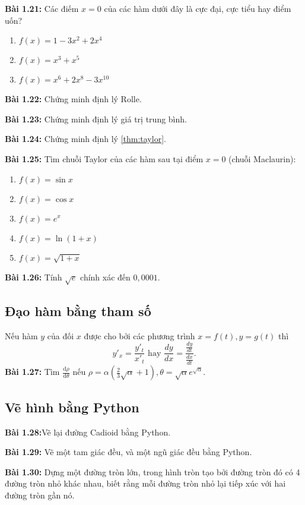 \textbf{Bài 1.21:} Các điếm \(x=0\) của các hàm dưới đây là cực đại, cực tiểu hay điểm uốn?
\begin{enumerate}[label=(\alph*)]
    \item \(f(x)=1-3x^2+2x^4\)
    \item \(f(x)=x^3+x^5\)
    \item \(f(x)=x^6+2x^8-3x^{10}\)
\end{enumerate}
\vspace{5pt}

\textbf{Bài 1.22:} Chứng minh định lý Rolle.
\vspace{5pt}

\textbf{Bài 1.23:} Chứng minh định lý giá trị trung bình.
\vspace{5pt}

\textbf{Bài 1.24:} Chứng minh định lý \ref{thm:taylor}.

\textbf{Bài 1.25:} Tìm chuỗi Taylor của các hàm sau tại điểm \(x=0\) (chuỗi Maclaurin):
\begin{enumerate}[label=(\alph*)]
    \item \(f(x)=\sin x\)
    \item \(f(x)=\cos x\)
    \item \(f(x)=e^x\)
    \item \(f(x)=\ln(1+x)\)
    \item \(f(x)=\sqrt{1+x}\)
\end{enumerate}
\vspace{5pt}

\textbf{Bài 1.26:} Tính \(\sqrt{e}\) chính xác đến \(0,0001\). 
\vspace{5pt}

\subsection*{Đạo hàm bằng tham số}
Nếu hàm \(y\) của đối \(x\) được cho bởi các phương trình \(x=f(t), y=g(t)\) thì
\[y'_x =\frac{y'_t}{x'_t} \text{ hay } \frac{dy}{dx}=\frac{\frac{dy}{dt}}{\frac{dx}{dt}}.\] 
\textbf{Bài 1.27:} Tìm \(\frac{\text{d}\rho}{\text{d}\theta}\) nếu \(\rho=\alpha\left(\frac{2}{3}\sqrt{\alpha}+1\right), \theta = \sqrt{\alpha}e^{\sqrt{\alpha}}.\)

\subsection*{Vẽ hình bằng Python}
\textbf{Bài 1.28:}Vẽ lại đường Cadioid  bằng Python.
\vspace{5pt}

\textbf{Bài 1.29:} Vẽ một tam giác đều, và một ngũ giác đều bằng Python.
\vspace{5pt}

\textbf{Bài 1.30:} Dựng một đường tròn lớn, trong hình tròn tạo bởi đường tròn đó có 4 đường tròn nhỏ khác nhau, biết rằng mỗi đường tròn nhỏ lại tiếp xúc với hai đường tròn gần nó.
\vspace{5pt}



